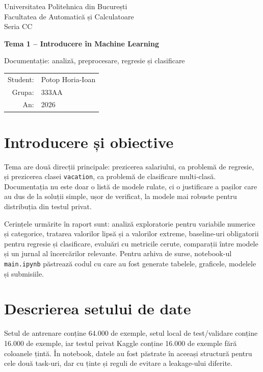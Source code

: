 \documentclass[12pt,a4paper]{article}
\begin{document}
\begin{titlepage}
\centering
\vspace*{1.2cm}
{\Large Universitatea Politehnica din București\\[0.25em]
Facultatea de Automatică și Calculatoare\\[0.25em]
Seria CC}\par
\vspace{2.5cm}
{\Huge\bfseries Tema 1 -- Introducere în Machine Learning\par}
\vspace{0.4cm}
{\Large Documentație: analiză, preprocesare, regresie și clasificare}\par
\vspace{2.2cm}
\begin{tabular}{rl}
Student: & Potop Horia-Ioan \\
Grupa: & 333AA \\
An: & 2026 \\
\end{tabular}
\vfill
\begin{minipage}{0.86\textwidth}
\end{minipage}
\end{titlepage}

\setlength{\textfloatsep}{8pt}
\setlength{\floatsep}{8pt}
\setlength{\intextsep}{8pt}
\captionsetup[figure]{font=small,skip=4pt}
\tableofcontents
\newpage

\section{Introducere și obiective}
Tema are două direcții principale: prezicerea salariului, ca problemă de regresie, și prezicerea clasei \texttt{vacation}, ca problemă de clasificare multi-clasă. Documentația nu este doar o listă de modele rulate, ci o justificare a pașilor care au dus de la soluții simple, ușor de verificat, la modele mai robuste pentru distribuția din testul privat.

Cerințele urmărite în raport sunt: analiză exploratorie pentru variabile numerice și categorice, tratarea valorilor lipsă și a valorilor extreme, baseline-uri obligatorii pentru regresie și clasificare, evaluări cu metricile cerute, comparații între modele și un jurnal al încercărilor relevante. Pentru arhiva de surse, notebook-ul \texttt{main.ipynb} păstrează codul cu care au fost generate tabelele, graficele, modelele și submisiile.

\section{Descrierea setului de date}
Setul de antrenare conține 64.000 de exemple, setul local de test/validare conține 16.000 de exemple, iar testul privat Kaggle conține 16.000 de exemple fără coloanele țintă. În notebook, datele au fost păstrate în aceeași structură pentru cele două task-uri, dar cu ținte și reguli de evitare a leakage-ului diferite.
\end{document}
